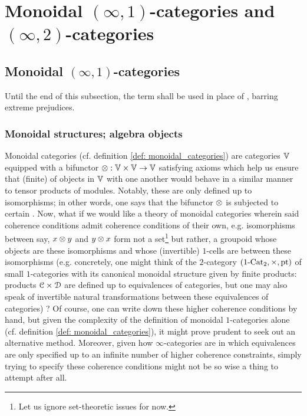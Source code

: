 \section{Monoidal \texorpdfstring{$(\infty, 1)$}{}-categories and \texorpdfstring{$(\infty, 2)$}{}-categories}
    \subsection{Monoidal \texorpdfstring{$(\infty, 1)$}{}-categories}
        \begin{convention}
            Until the end of this subsection, the term  shall be used in place of , barring extreme prejudices.
        \end{convention}
    
        \subsubsection{Monoidal structures; algebra objects}
            Monoidal categories (cf. definition \ref{def: monoidal_categories}) are categories $\mathbb{V}$ equipped with a bifunctor $\tensor: \V \x \V \to \V$ satisfying axioms which help us ensure that (finite)  of objects in $\mathbb{V}$ with one another would behave in a similar manner to tensor products of modules. Notably, these  are only defined up to isomorphisms; in other words, one says that the bifunctor $\tensor$ is subjected to certain . Now, what if we would like a theory of monoidal categories wherein said coherence conditions admit coherence conditions of their own, e.g. isomorphisms between say, $x \tensor y$ and $y \tensor x$ form not a set\footnote{Let us ignore set-theoretic issues for now.} but rather, a groupoid whose objects are these isomorphisms and whose (invertible) $1$-cells are  between these isomorphisms (e.g. concretely, one might think of the $2$-category $(1\-\Cat_2, \x, \pt)$ of small $1$-categories with its canonical monoidal structure given by finite products: products $\C \x \D$ are defined up to equivalences of categories, but one may also speak of invertible natural transformations between these equivalences of categories) ? Of course, one can write down these higher coherence conditions by hand, but given the complexity of the definition of monoidal $1$-categories alone (cf. definition \ref{def: monoidal_categories}), it might prove prudent to seek out an alternative method. Moreover, given how $\infty$-categories are  in which equivalences are only specified up to an infinite number of higher coherence constraints, simply trying to specify these coherence conditions might not be so wise a thing to attempt after all.
            
